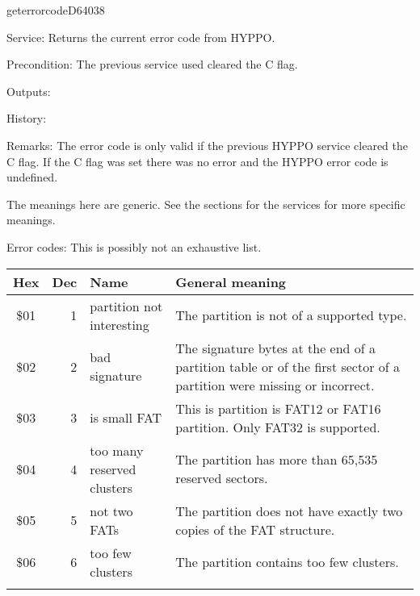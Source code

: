 \begin{hyppotrap}{geterrorcode}{D640}{38}
\item [Service:]
  Returns the current error code from HYPPO.
\item [Precondition:]
  The previous service used cleared the C flag.
\item [Outputs:]
\item [History:]
\item [Remarks:]
  The error code is only valid if the previous HYPPO service cleared the C flag.
  If the C flag was set there was no error and the HYPPO error code is
  undefined.

  The meanings here are generic. See the sections for the services for more
  specific meanings.
\item [Error codes:] This is possibly not an exhaustive list.
{
  \begin{longtable}{|c|r|l|p{8cm}|}
    \hline
    \textbf{Hex} & \textbf{Dec} & \textbf{Name} & \textbf{General meaning}\\
    \hline
    \endhead
    \index{HYPPO Error Codes!\$01}
    \$01 & 1 & \makecell[tl]{partition not \\ interesting} &
    The partition is not of a supported type.
    \\\hline
    \index{HYPPO Error Codes!\$02}
    \$02 & 2 & bad signature &
    The signature bytes at the end of a partition table or of the first sector
    of a partition were missing or incorrect.
    \\\hline
    \index{HYPPO Error Codes!\$03}
    \$03 & 3 & is small FAT &
    This is partition is FAT12 or FAT16 partition. Only FAT32 is supported.
    \\\hline
    \index{HYPPO Error Codes!\$04}
    \$04 & 4 & \makecell[tl]{too many reserved\\clusters} &
    The partition has more than 65,535 reserved sectors.
    \\\hline
    \index{HYPPO Error Codes!\$05}
    \$05 & 5 & not two FATs &
    The partition does not have exactly two copies of the FAT structure.
    \\\hline
    \index{HYPPO Error Codes!\$06}
    \$06 & 6 & too few clusters &
    The partition contains too few clusters.
    \\\hline
    \index{HYPPO Error Codes!\$07}

\end{longtable}}
\end{hyppotrap}

